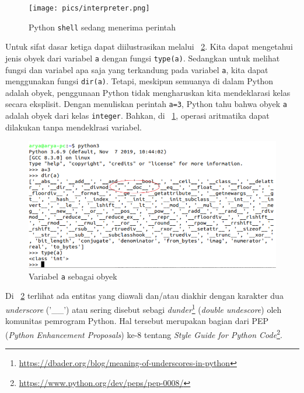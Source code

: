 \begin{figure}[h!]
  \begin{center}
    \texttt{[image: pics/interpreter.png]}
    \caption{Python \texttt{shell} sedang menerima perintah}
    \label{fig:interpreter}
  \end{center}
\end{figure}

Untuk sifat dasar ketiga dapat diilustrasikan melalui \figurename~\ref{fig:obyek}. Kita dapat mengetahui jenis obyek dari variabel \texttt{a} dengan fungsi \texttt{type(a)}. Sedangkan untuk melihat fungsi dan variabel apa saja yang terkandung pada variabel \texttt{a}, kita dapat menggunakan fungsi \texttt{dir(a)}. Tetapi, meskipun semuanya di dalam Python adalah obyek, penggunaan Python tidak mengharuskan kita mendeklarasi kelas secara eksplisit. Dengan menuliskan perintah \texttt{a=3}, Python tahu bahwa obyek \texttt{a} adalah obyek dari kelas \texttt{integer}. Bahkan, di \figurename~\ref{fig:interpreter}, operasi aritmatika dapat dilakukan tanpa mendeklrasi variabel.

\begin{figure}[h!]
  \begin{center}
    \includegraphics[scale=.5]{pics/interpreter2a.png}
    \caption{Variabel \texttt{a} sebagai obyek}
    \label{fig:obyek}
  \end{center}
\end{figure}

Di \figurename~\ref{fig:obyek} terlihat ada entitas yang diawali dan/atau diakhir dengan karakter dua \textit{underscore} ('\_\_') atau sering disebut sebagi \textit{dunder}\footnote{\url{https://dbader.org/blog/meaning-of-underscores-in-python}} (\textit{double undescore}) oleh komunitas pemrogram Python. Hal tersebut merupakan bagian dari PEP (\textit{Python Enhancement Proposals}) ke-8 tentang \textit{Style Guide for Python Code}\footnote{\url{https://www.python.org/dev/peps/pep-0008/}}.

